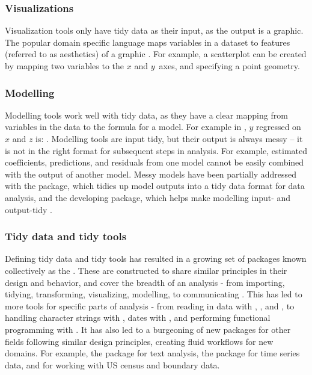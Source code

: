 \documentclass[article]{jss}
\begin{document}
\hypertarget{tidy-vis}{%
\subsubsection{Visualizations}\label{tidy-vis}}

Visualization tools only have tidy data as their input, as the output is a
graphic.  The popular domain specific language  maps variables
in a dataset to features (referred to as aesthetics) of a graphic
\citep{ggplot2}.  For example, a scatterplot can be created by mapping two
variables to the $x$ and $y$~axes, and specifying a point geometry.

\hypertarget{tidy-model}{%
\subsubsection{Modelling}\label{tidy-model}}

Modelling tools work well with tidy data, as they have a clear mapping from
variables in the data to the formula for a model.  For example in
, $y$ regressed on $x$ and $z$ is: .  Modelling
tools are input tidy, but their output is always messy -- it is not in the
right format for subsequent steps in analysis.  For example, estimated
coefficients, predictions, and residuals from one model cannot be easily
combined with the output of another model.  Messy models have been partially
addressed with the  package, which tidies up model outputs into a
tidy data format for data analysis, and the developing 
package, which helps make modelling input- and output-tidy \citep{recipes}.

\hypertarget{the-tidyverse}{%
\subsubsection{Tidy data and tidy tools}\label{the-tidyverse}}

Defining tidy data and tidy tools has resulted in a growing set of packages
known collectively as the  \citep{tidyverse}.  These are
constructed to share similar principles in their design and behavior, and
cover the breadth of an analysis - from importing, tidying, transforming,
visualizing, modelling, to communicating \citep{r4ds, tidyverse}.  This has
led to more tools for specific parts of analysis - from reading in data with
, , and , to handling character strings
with , dates with , and performing functional
programming with  \citep{readr, readxl, haven, stringr,
lubridate, purrr}.  It has also led to a burgeoning of new packages for
other fields following similar design principles, creating fluid workflows
for new domains.  For example, the  \citep{tidytext} package
for text analysis, the  \citep{wang2020tsibble} package for
time series data, and  \citep{tidycensus} for working with
US census and boundary data.
\end{document}
